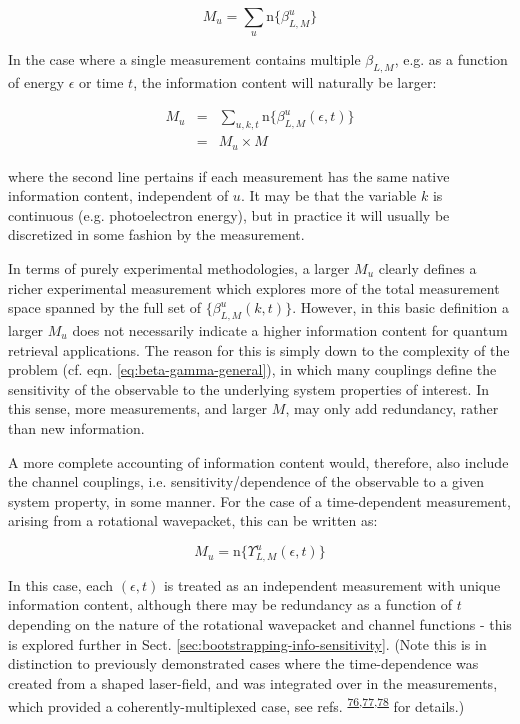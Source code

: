 \documentclass[10pt]{article}
\begin{document}
\begin{equation}
M_{u}=\sum_{u}\mathrm{n}\{\beta_{L,M}^{u}\}
\end{equation}

In the case where a single measurement contains multiple $\beta_{L,M}$, e.g. as a function of energy $\epsilon$ or time $t$, the information content will naturally be larger:

\begin{eqnarray}
M_{u} & = & \sum_{u,k,t}\mathrm{n}\{\beta_{L,M}^{u}(\epsilon,t)\}\\
 & = & M_{u}\times M
\end{eqnarray}

where the second line pertains if each measurement has the same native
information content, independent of $u$. It may be that the variable
$k$ is continuous (e.g. photoelectron energy), but in practice it
will usually be discretized in some fashion by the measurement.

In terms of purely experimental methodologies, a larger $M_{u}$ clearly defines a richer experimental measurement which explores more of the total measurement space spanned by the full set of $\{\beta_{L,M}^{u}(k,t)\}$. However, in this basic definition a larger $M_{u}$ does not necessarily indicate a higher information content for quantum retrieval applications.
The reason for this is simply down to the complexity of the problem
(cf. eqn. \ref{eq:beta-gamma-general}), in which many couplings define
the sensitivity of the observable to the underlying system properties
of interest. In this sense, more measurements, and larger $M$, may
only add redundancy, rather than new information.

A more complete accounting of information content would, therefore,
also include the channel couplings, i.e. sensitivity/dependence of the observable to a given system property, in some manner. For the case of a time-dependent measurement, arising from a rotational wavepacket, this can be written as:

\begin{equation}
M_{u}=\mathrm{n}\{\varUpsilon_{L,M}^{u}(\epsilon,t)\}
\end{equation}

In this case, each $(\epsilon,t)$ is treated as an independent measurement with unique information content, although there may be redundancy as a function of $t$ depending on the nature of the rotational wavepacket and channel functions - this is explored further in Sect. \ref{sec:bootstrapping-info-sensitivity}. (Note this is in distinction to previously demonstrated cases where the time-dependence was created from a shaped laser-field, and was integrated over in the measurements, which provided a coherently-multiplexed case, see refs. \textsuperscript{\hyperref[csl:76]{76},\hyperref[csl:77]{77},\hyperref[csl:78]{78}} for details.)
\end{document}
